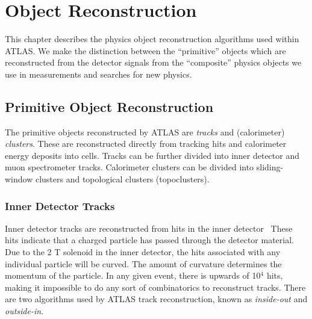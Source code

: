 

\chapter[Object Reconstruction][Top of Page Title]{Object Reconstruction}
\label{ch:reconstruction}

This chapter describes the physics object reconstruction algorithms used within ATLAS.
We make the distinction between the ``primitive'' objects which are reconstructed from the detector signals from the ``composite'' physics objects we use in measurements and searches for new physics.

\section{Primitive Object Reconstruction}

The primitive objects reconstructed by ATLAS are \textit{tracks} and (calorimeter) \textit{clusters}.
These are reconstructed directly from tracking hits and calorimeter energy deposits into cells.
Tracks can be further divided into inner detector and muon spectrometer tracks.
Calorimeter clusters can be divided into sliding-window clusters and topological clusters (topoclusters).
\subsection{Inner Detector Tracks}\label{sec:id_tracks}

Inner detector tracks are reconstructed from hits in the inner detector~\cite{ATLAS-CONF-2012-042,ATL-PHYS-PUB-2015-051}
These hits indicate that a charged particle has passed through the detector material.
Due to the 2 T solenoid in the inner detector, the hits associated with any individual particle will be curved.
The amount of curvature determines the momentum of the particle.
In any given event, there is upwards of 10$^4$ hits, making it impossible to do any sort of combinatorics to reconstruct tracks.
There are two algorithms used by ATLAS track reconstruction, known as \textit{inside-out} and \textit{outside-in}.

